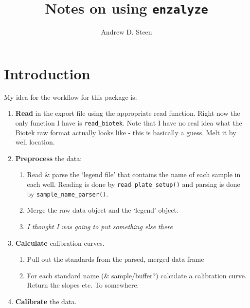 \documentclass{article}
\title{Notes on using \texttt{enzalyze}}
\author{Andrew D. Steen}
\begin{document}

\maketitle

\section{Introduction}

My idea for the workflow for this package is:

\begin{enumerate}
  \item \textbf{Read} in the export file using the appropriate read function. Right now the only function I have is \texttt{read\_biotek}. Note that I have no real idea what the Biotek raw format actually looks like - this is basically a guess. Melt it by well location.
  \item \textbf{Preprocess} the data:
  \begin{enumerate}
    \item Read \& parse the `legend file' that contains the name of each sample in each well. Reading is done by \texttt{read\_plate\_setup()} and parsing is done by \texttt{sample\_name\_parser()}.
    \item Merge the raw data object and the `legend' object. 
    \item \textit{I thought I was going to put something else there}
  \end{enumerate}
  \item \textbf{Calculate} calibration curves.
    \begin{enumerate}
      \item Pull out the standards from the parsed, merged data frame
      \item For each standard name (\& sample/buffer?) calculate a calibration curve. Return the slopes etc. To somewhere.
    \end{enumerate}
    \item \textbf{Calibrate} the data.
\end{enumerate}
\end{document}
